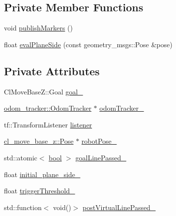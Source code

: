 \subsection*{Private Member Functions}
\begin{DoxyCompactItemize}
\item 
void \hyperlink{classcl__move__base__z_1_1CbUndoPathBackwards2_afaa039c78eb70ba012d86d8c77b9828c}{publish\+Markers} ()
\item 
float \hyperlink{classcl__move__base__z_1_1CbUndoPathBackwards2_a20b9a6799b0484810b0319f5a97d020e}{eval\+Plane\+Side} (const geometry\+\_\+msgs\+::\+Pose \&pose)
\end{DoxyCompactItemize}
\subsection*{Private Attributes}
\begin{DoxyCompactItemize}
\item 
Cl\+Move\+Base\+Z\+::\+Goal \hyperlink{classcl__move__base__z_1_1CbUndoPathBackwards2_ad119c38ee9cb341c9b468682d1794538}{goal\+\_\+}
\item 
\hyperlink{classcl__move__base__z_1_1odom__tracker_1_1OdomTracker}{odom\+\_\+tracker\+::\+Odom\+Tracker} $\ast$ \hyperlink{classcl__move__base__z_1_1CbUndoPathBackwards2_a1faa9bf6fef87280e28d4016f5c0843e}{odom\+Tracker\+\_\+}
\item 
tf\+::\+Transform\+Listener \hyperlink{classcl__move__base__z_1_1CbUndoPathBackwards2_a4531d3f52b12a4cce20ac1545ca2cb61}{listener}
\item 
\hyperlink{classcl__move__base__z_1_1Pose}{cl\+\_\+move\+\_\+base\+\_\+z\+::\+Pose} $\ast$ \hyperlink{classcl__move__base__z_1_1CbUndoPathBackwards2_a2d398dac07efaca840fbcea31957cf7a}{robot\+Pose\+\_\+}
\item 
std\+::atomic$<$ \hyperlink{classbool}{bool} $>$ \hyperlink{classcl__move__base__z_1_1CbUndoPathBackwards2_a1c037317330c74b60660548f09a01749}{goal\+Line\+Passed\+\_\+}
\item 
float \hyperlink{classcl__move__base__z_1_1CbUndoPathBackwards2_abc388e4c9576f04d1fad869aa8651750}{initial\+\_\+plane\+\_\+side\+\_\+}
\item 
float \hyperlink{classcl__move__base__z_1_1CbUndoPathBackwards2_a452bcdab678ea02d6d6a0ae06fb484ab}{trigger\+Threshold\+\_\+}
\item 
std\+::function$<$ void()$>$ \hyperlink{classcl__move__base__z_1_1CbUndoPathBackwards2_a2405e8194c63dce4462b6d4910031fe8}{post\+Virtual\+Line\+Passed\+\_\+}
\end{DoxyCompactItemize}
